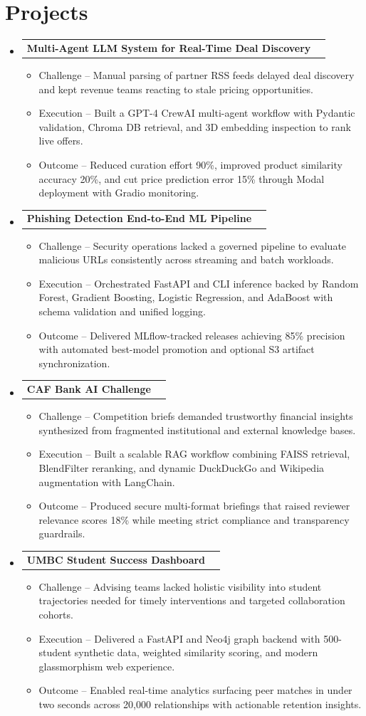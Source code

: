 \documentclass[letterpaper,9pt]{article}
\makeatletter
\newcommand{\resumeItem}[1]{\item \small{#1}}
\newcommand{\resumeProjectHeading}[2]{
  \item
    \begin{tabular*}{\textwidth}{l@{\extracolsep{\fill}}r}
      \small #1 & \textbf{\small #2}\\
    \end{tabular*}\vspace{-6pt}
}
\newcommand{\resumeSubHeadingListStart}{\begin{itemize}[leftmargin=0.0in,label={},itemsep=4pt,topsep=2pt]}
\newcommand{\resumeSubHeadingListEnd}{\end{itemize}}
\newcommand{\resumeItemListStart}{\begin{itemize}[leftmargin=0.16in,labelsep=0.1in,itemsep=1.5pt,topsep=1.5pt]}
\newcommand{\resumeItemListEnd}{\end{itemize}\vspace{-4pt}}
\makeatother
\begin{document}
\section{Projects}
  \resumeSubHeadingListStart
    \resumeProjectHeading{\textbf{Multi-Agent LLM System for Real-Time Deal Discovery}}{}
      \resumeItemListStart
        \resumeItem{Challenge -- Manual parsing of partner RSS feeds delayed deal discovery and kept revenue teams reacting to stale pricing opportunities.}
        \resumeItem{Execution -- Built a GPT-4 CrewAI multi-agent workflow with Pydantic validation, Chroma DB retrieval, and 3D embedding inspection to rank live offers.}
        \resumeItem{Outcome -- Reduced curation effort 90\%, improved product similarity accuracy 20\%, and cut price prediction error 15\% through Modal deployment with Gradio monitoring.}
      \resumeItemListEnd
    \resumeProjectHeading{\textbf{Phishing Detection End-to-End ML Pipeline}}{}
      \resumeItemListStart
        \resumeItem{Challenge -- Security operations lacked a governed pipeline to evaluate malicious URLs consistently across streaming and batch workloads.}
        \resumeItem{Execution -- Orchestrated FastAPI and CLI inference backed by Random Forest, Gradient Boosting, Logistic Regression, and AdaBoost with schema validation and unified logging.}
        \resumeItem{Outcome -- Delivered MLflow-tracked releases achieving 85\% precision with automated best-model promotion and optional S3 artifact synchronization.}
      \resumeItemListEnd
    \resumeProjectHeading{\textbf{CAF Bank AI Challenge}}{}
      \resumeItemListStart
        \resumeItem{Challenge -- Competition briefs demanded trustworthy financial insights synthesized from fragmented institutional and external knowledge bases.}
        \resumeItem{Execution -- Built a scalable RAG workflow combining FAISS retrieval, BlendFilter reranking, and dynamic DuckDuckGo and Wikipedia augmentation with LangChain.}
        \resumeItem{Outcome -- Produced secure multi-format briefings that raised reviewer relevance scores 18\% while meeting strict compliance and transparency guardrails.}
      \resumeItemListEnd
    \resumeProjectHeading{\textbf{UMBC Student Success Dashboard}}{}
      \resumeItemListStart
        \resumeItem{Challenge -- Advising teams lacked holistic visibility into student trajectories needed for timely interventions and targeted collaboration cohorts.}
        \resumeItem{Execution -- Delivered a FastAPI and Neo4j graph backend with 500-student synthetic data, weighted similarity scoring, and modern glassmorphism web experience.}
        \resumeItem{Outcome -- Enabled real-time analytics surfacing peer matches in under two seconds across 20,000 relationships with actionable retention insights.}
      \resumeItemListEnd
  \resumeSubHeadingListEnd
\end{document}
